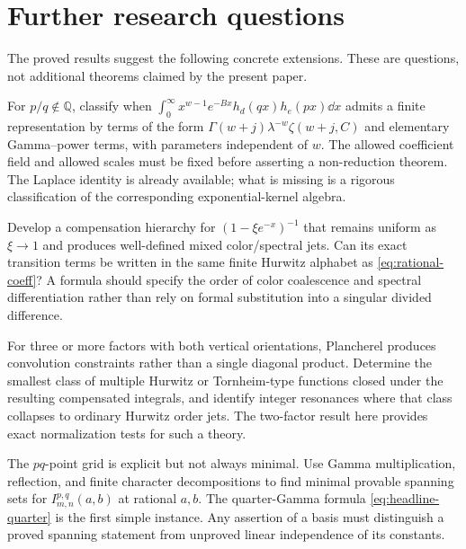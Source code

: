 \section{Further research questions}
\label{sec:questions}

The proved results suggest the following concrete extensions. These are
questions, not additional theorems claimed by the present paper.

\begin{question}
For $p/q\notin\mathbb Q$, classify when
$\int_0^\infty x^{w-1}e^{-Bx}h_d(qx)h_e(px)\dd x$ admits a finite
representation by terms of the form
$\Gamma(w+j)\lambda^{-w}\zeta(w+j,C)$ and elementary Gamma--power terms,
with parameters independent of $w$. The allowed coefficient field and
allowed scales must be fixed before asserting a non-reduction theorem.
The Laplace identity is already available; what is missing is a rigorous
classification of the corresponding exponential-kernel algebra.
\end{question}

\begin{question}
Develop a compensation hierarchy for
$(1-\xi e^{-x})^{-1}$ that remains uniform as $\xi\to1$ and produces
well-defined mixed color/spectral jets. Can its exact transition terms
be written in the same finite Hurwitz alphabet as
\eqref{eq:rational-coeff}? A formula should specify the order of color
coalescence and spectral differentiation rather than rely on formal
substitution into a singular divided difference.
\end{question}

\begin{question}
For three or more factors with both vertical orientations, Plancherel
produces convolution constraints rather than a single diagonal product.
Determine the smallest class of multiple Hurwitz or Tornheim-type
functions closed under the resulting compensated integrals, and identify
integer resonances where that class collapses to ordinary Hurwitz order
jets. The two-factor result here provides exact normalization tests for
such a theory.
\end{question}

\begin{question}
The $pq$-point grid is explicit but not always minimal. Use Gamma
multiplication, reflection, and finite character decompositions to find
minimal provable spanning sets for
$I_{m,n}^{p,q}(a,b)$ at rational $a,b$. The quarter-Gamma formula
\eqref{eq:headline-quarter} is the first simple instance. Any assertion
of a basis must distinguish a proved spanning statement from unproved
linear independence of its constants.
\end{question}

